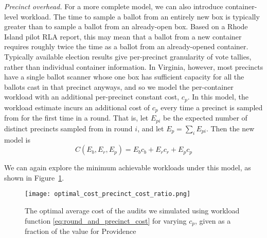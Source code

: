 \emph{Precinct overhead.} For a more complete model, we can also introduce container-level workload. The time to sample a ballot from an entirely new box is typically greater than to sample a ballot from an already-open box. Based on a Rhode Island pilot RLA report\cite{RI-report}, this may mean that a ballot from a new container requires roughly twice the time as a ballot from an already-opened container. Typically available election results give per-precinct granularity of vote tallies, rather than individual container information. In Virginia, however, most precincts have a single ballot scanner whose one box has sufficient capacity for all the ballots cast in that precinct anyways, and so we model the per-container workload with an additional per-precinct constant cost, $c_p$. In this model, the workload estimate incurs an additional cost of $c_p$ every time a precinct is sampled from for the first time in a round. That is, let $E_{pi}$ be the expected number of distinct precincts sampled from in round $i$, and let $E_p=\sum_i E_{pi}$. Then the new model is
\begin{equation}
C(E_b, E_r, E_p) = E_b c_b + E_r c_r + E_p c_p
\label{eq:round_and_precinct_cost}
\end{equation}

We can again explore the minimum achievable workloads under this model, as shown in Figure~\ref{fig:optimal_cost_precinct_cost_ratio}.

\begin{figure}
\texttt{[image: optimal\_cost\_precinct\_cost\_ratio.png]}
\caption{The optimal average cost of the audits we simulated using workload function \ref{eq:round_and_precinct_cost} for varying $c_p$, given as a fraction of the value for Providence}
\label{fig:optimal_cost_precinct_cost_ratio}
\end{figure}


